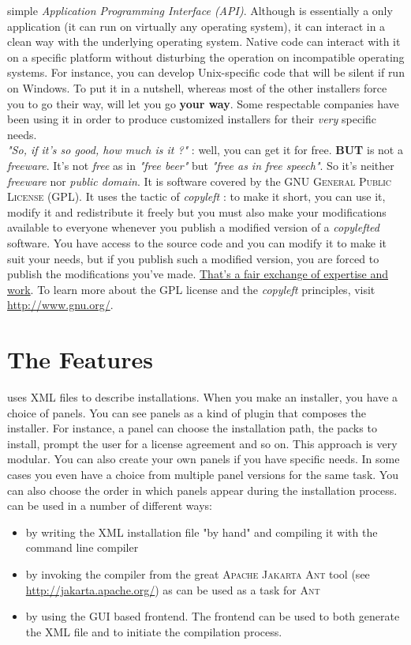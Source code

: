 simple \textit{Application Programming Interface (API)}. Although
\IzPack is essentially a \Java only application (it can run on virtually
any operating system), it can interact in a clean way with the
underlying operating system. Native code can interact with it on a
specific platform without disturbing the operation on incompatible
operating systems. For instance, you can develop Unix-specific code that
will be silent if run on Windows. To put it in a nutshell, whereas most
of the other \Java installers force you to go their way, \IzPack will
let you go \textbf{your way}. Some respectable companies have been using
it in order to produce customized  installers for their \textsl{very}
specific needs.\\

\textit{"So, if it's so good, how much is it ?"} : well, you can get it
for free. \textbf{BUT} \IzPack is not a \textit{freeware}. It's not
\textit{free} as in \textit{"free beer"} but \textit{"free as in free
speech"}. So it's neither \textit{freeware} nor \textit{public domain}.
It is software covered by the \textsc{GNU General Public License} (GPL).
It uses the tactic of \textit{copyleft} : to make it short, you can use
it, modify it and redistribute it freely but you must also make your
modifications available to everyone whenever you publish a modified
version of a \textit{copylefted} software. You have access to the
\IzPack source code and you can modify it to make it suit your needs,
but if you publish such a modified version, you are forced to publish
the modifications you've made. \underline{That's a fair exchange of
expertise and  work}. To learn more about the GPL license and the
\textit{copyleft} principles, visit \mbox{\url{http://www.gnu.org/}}.\\

\section*{The Features}

\IzPack uses XML files to describe installations. When you make an
installer, you have a choice of panels. You can see panels as a kind of
plugin that composes the installer. For instance, a panel can choose the
installation path, the packs to install, prompt the user for a license
agreement and so on. This approach is very modular. You can also create
your own panels if you have specific needs. In some cases you even have
a choice from multiple panel versions for the same task. You can also
choose the order in which panels appear during the installation process.
\IzPack can be used in a number of different ways:
\begin{itemize}
	\item by writing the XML installation file "by hand" and compiling
	it with the	command line compiler
	\item by invoking the compiler from the great \textsc{Apache Jakarta
	Ant} tool (see \url{http://jakarta.apache.org/}) as \IzPack can be
	used as a task for \textsc{Ant}
	\item by using the GUI based frontend. The frontend can be used to
	both generate the XML file and to initiate the compilation process.
\end{itemize}\

